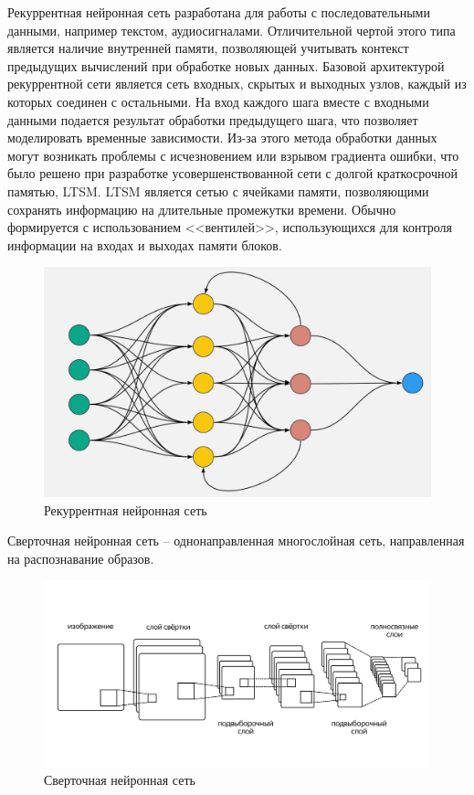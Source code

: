 Рекуррентная нейронная сеть разработана для работы с последовательными данными, например текстом, аудиосигналами. Отличительной чертой этого типа является наличие внутренней памяти, позволяющей учитывать контекст предыдущих вычислений при обработке новых данных. Базовой архитектурой рекуррентной сети является сеть входных, скрытых и выходных узлов, каждый из которых соединен с остальными. На вход каждого шага вместе с входными данными подается результат обработки предыдущего шага, что позволяет моделировать временные зависимости. Из-за этого метода обработки данных могут возникать проблемы с исчезновением или взрывом градиента ошибки, что было решено при разработке усовершенствованной сети с долгой краткосрочной памятью, LTSM. LTSM является сетью с ячейками памяти, позволяющими сохранять информацию на длительные промежутки времени. Обычно формируется с использованием <<вентилей>>, использующихся для контроля информации на входах и выходах памяти блоков.

\begin{figure}[h]
	\centering
	\includegraphics[width=0.7\linewidth]{images/RNN}
	\caption{Рекуррентная нейронная сеть}
	\label{fig:rnn}
\end{figure}

Сверточная нейронная сеть -- однонаправленная многослойная сеть, направленная на распознавание образов.

\begin{figure}[h]
	\centering
	\includegraphics[width=0.7\linewidth]{images/CNN}
	\caption{Сверточная нейронная сеть}
	\label{fig:cnn}
\end{figure}


